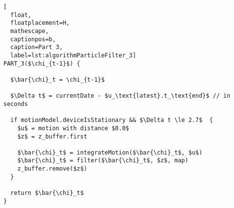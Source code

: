 \begin{lstlisting}[
  float,
  floatplacement=H,
  mathescape,
  captionpos=b,
  caption=Part 3,
  label=lst:algorithmParticleFilter_3]
PART_3($\chi_{t-1}$) {

  $\bar{\chi}_t = \chi_{t-1}$

  $\Delta t$ = currentDate - $u_\text{latest}.t_\text{end}$ // in seconds

  if motionModel.deviceIsStationary && $\Delta t \le 2.7$  {
    $u$ = motion with distance $0.0$
    $z$ = z_buffer.first

    $\bar{\chi}_t$ = integrateMotion($\bar{\chi}_t$, $u$)
    $\bar{\chi}_t$ = filter($\bar{\chi}_t$, $z$, map)
    z_buffer.remove($z$)
  }

  return $\bar{\chi}_t$
}
\end{lstlisting}

